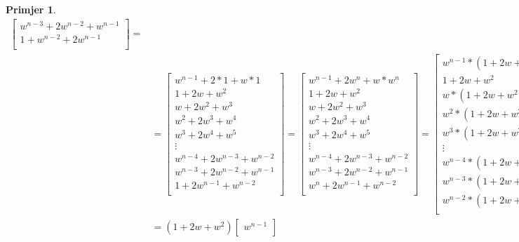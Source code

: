 \documentclass[11pt]{article}
\newtheorem{example}{Primjer}
\begin{document}
\begin{example}
\[\begin{split}
\begin{bmatrix}
		w^{n-3} + 2w^{n-2} + w^{n-1} \\
		1 + w^{n-2} + 2w^{n-1} \\
		\end{bmatrix} = \\
	 	 & =  
		\begin{bmatrix}
		 w^{n-1} + 2 * 1 + w * 1 \\
		1 + 2w + w^2       \\
		w + 2w^2 + w^3       \\
		w^2 + 2w^3 + w^4  \\
		w^3 + 2w^4 + w^5  \\
		\vdots \\
		w^{n-4} + 2w^{n-3} + w^{n-2} \\
		w^{n-3} + 2w^{n-2} + w^{n-1} \\
		1 + 2w^{n-1} + w^{n-2} \\
		\end{bmatrix}
		= 
		\begin{bmatrix}
		w^{n-1} + 2 w^n + w * w^{n} \\
		1 + 2w + w^2       \\
		w + 2w^2 + w^3       \\
		w^2 + 2w^3 + w^4  \\
		w^3 + 2w^4 + w^5  \\
		\vdots \\
		w^{n-4} + 2w^{n-3} + w^{n-2} \\
		w^{n-3} + 2w^{n-2} + w^{n-1} \\
		w^n + 2w^{n-1} + w^{n-2} \\
		\end{bmatrix}
		= 
		\begin{bmatrix}
		w^{n-1} * ( 1+ 2 w + w^2) \\
		1 + 2w + w^2       \\
		w * (1 + 2w + w^2)       \\
		w^2 * (1 + 2w + w^2)       \\
		w^3 * (1 + 2w + w^2)       \\
		\vdots \\
		w^{n-4} * (1 + 2w + w^2)       \\
		w^{n-3} * (1 + 2w + w^2)       \\
		w^{n-2} * (1 + 2w + w^2)       \\
		\end{bmatrix} = \\
		& = (1 + 2w + w^2)
		\begin{bmatrix}
		w^{n-1}  \\

\end{bmatrix}
\end{split}\]
\end{example}
\end{document}
